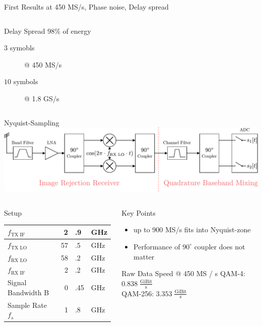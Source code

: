 \documentclass[10pt]{beamer}
\begin{document}
\begin{frame}{First Results at 450 MS/s, Phase noise, Delay spread}
\begin{columns}[T]
\begin{column}{.5\textwidth}
      \begin{block}{Delay Spread}
        98\% of energy
        \begin{description}
        \item[$3$ symobls] @ 450 MS/s
        \item[$10$ symbols] @ 1.8 GS/s
        \end{description}
      \end{block}
    \end{column}
  \end{columns}
\end{frame}

\begin{frame}{Nyquist-Sampling}
  \includegraphics[width=\textwidth]{figures/rx_3_bd} \\

  \begin{columns}[T]
    \begin{column}{.5\textwidth}
      \begin{block}{Setup}
        \begin{tabular}{|l|r@{}l@{~}l|}
          \hline
          $f_{\text{TX IF}}$ & 2&.9&GHz \\ \hline
          $f_{\text{TX LO}}$ & 57&.5&GHz \\ \hline
          $f_{\text{RX LO}}$ & 58&.2&GHz \\ \hline
          $f_{\text{RX IF}}$ & 2&.2&GHz \\ \hline
          Signal Bandwidth B & 0&.45&GHz \\ \hline
          Sample Rate $f_s$ & 1&.8&GHz \\ \hline
        \end{tabular}
      \end{block}
    \end{column}
    \begin{column}{.5\textwidth}
      \begin{block}{Key Points}
        \begin{itemize}
        \item up to 900 MS/s fits into Nyquist-zone
        \item Performance of $90^\circ$ coupler does not matter
        \end{itemize}
      \end{block}
      \begin{block}{Raw Data Speed @ 450 MS / s}
        QAM-4: $0.838 \;\frac{\text{GiBit}}{\text{s}}$ \\
        QAM-256: $3.353 \;\frac{\text{GiBit}}{\text{s}}$
      \end{block}
    \end{column}
  \end{columns}
\end{frame}
\end{document}
